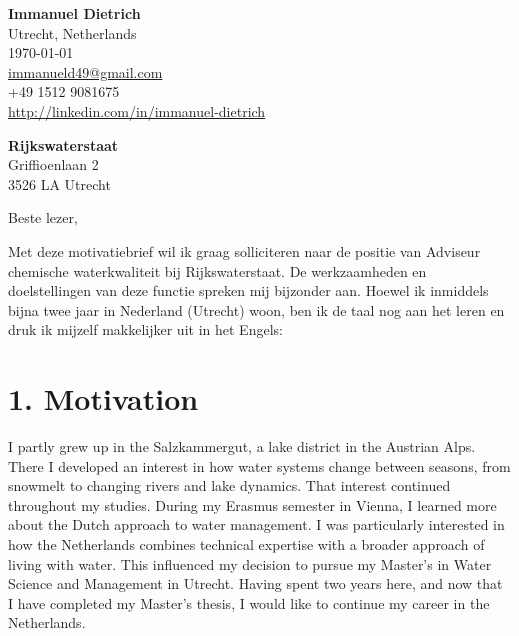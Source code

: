\documentclass[11pt]{report}
\begin{document}
 
\begin{titlepage}

    \begin{minipage}[t]{0.95\textwidth}
        \hfill
        \raggedleft
        \textbf{Immanuel Dietrich} \\
        Utrecht, Netherlands \\
        \today\\
        \href{mailto:immanueld49@gmail.com}{immanueld49@gmail.com} \\
        +49 1512 9081675 \\
        \url{http://linkedin.com/in/immanuel-dietrich}
    \end{minipage}

\raggedright \textbf{Rijkswaterstaat}  \\  Griffioenlaan 2 \\  3526 LA Utrecht \\ 

\vspace{0.7em}

\raggedright Beste lezer,\\

\vspace{0.7em}

Met deze motivatiebrief wil ik graag solliciteren naar de positie van Adviseur chemische waterkwaliteit bij Rijkswaterstaat. De werkzaamheden en doelstellingen van deze functie spreken mij bijzonder aan. 
Hoewel ik inmiddels bijna twee jaar in Nederland (Utrecht) woon, ben ik de taal nog aan het leren en druk ik mijzelf makkelijker uit in het Engels:

\vspace{0.7em}

\section*{1. Motivation}

I partly grew up in the Salzkammergut, a lake district in the Austrian Alps. There I developed an interest in how water systems change between seasons, from snowmelt to changing rivers and lake dynamics. That interest continued throughout my studies. 
During my Erasmus semester in Vienna, I learned more about the Dutch approach to water management. I was particularly interested in how the Netherlands combines technical expertise with a 
broader approach of living with water. This influenced my decision to pursue my Master's in Water Science and Management in Utrecht. Having spent two years here, and now that I have completed my Master's thesis, I would like to continue my career in the Netherlands.


\end{titlepage}
\end{document}
